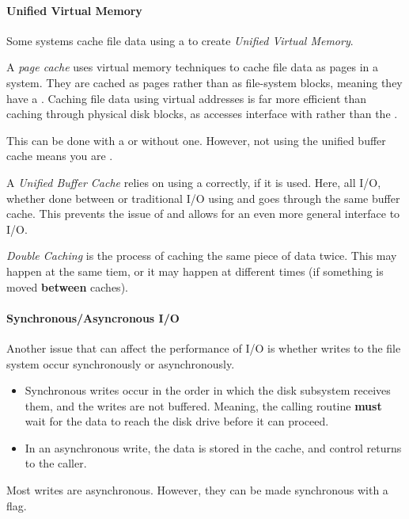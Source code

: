 \paragraph{Unified Virtual Memory}\label{par:Unified_Virtual_Memory}
Some systems cache file data using a  to create \emph{Unified Virtual Memory}.

\begin{definition}\label{def:Page_Cache}
  A \emph{page cache} uses virtual memory techniques to cache file data as pages in a  system.
  They are cached as pages rather than as file-system blocks, meaning they have a .
  Caching file data using virtual addresses is far more efficient than caching through physical disk blocks, as accesses interface with  rather than the .
\end{definition}

This can be done with a  or without one.
However, not using the unified buffer cache means you are .

\begin{definition}\label{def:Unified_Buffer_Cache}
  A \emph{Unified Buffer Cache} relies on using a  correctly, if it is used.
  Here, all I/O, whether done between  or traditional I/O using  and  goes through the same buffer cache.
  This prevents the issue of  and allows for an even more general interface to I/O.
\end{definition}

\begin{definition}\label{def:Double_Caching}
  \emph{Double Caching} is the process of caching the same piece of data twice.
  This may happen at the same tiem, or it may happen at different times (if something is moved \textbf{between} caches).
\end{definition}

\paragraph{Synchronous/Asyncronous I/O}\label{par:Sync_Async_IO}
Another issue that can affect the performance of I/O is whether writes to the file system occur synchronously or asynchronously.
\begin{itemize}[noitemsep]
\item Synchronous writes occur in the order in which the disk subsystem receives them, and the writes are not buffered.
  Meaning, the calling routine \textbf{must} wait for the data to reach the disk drive before it can proceed.
\item In an asynchronous write, the data is stored in the cache, and control returns to the caller.
\end{itemize}

Most writes are asynchronous.
However, they can be made synchronous with a flag.


